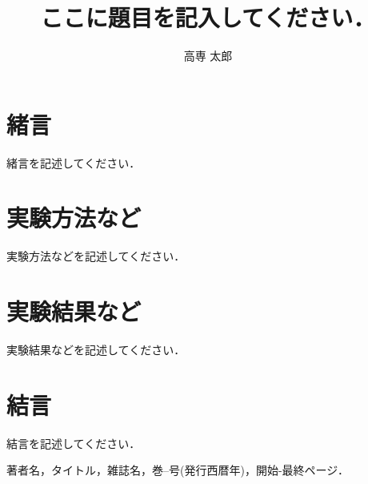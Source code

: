 \documentclass{advanced}
\title{ここに題目を記入してください．}
\author{高専 太郎}
\begin{document}
	\maketitle

	\section{緒言}

		緒言を記述してください．

	\section{実験方法など}

		実験方法などを記述してください．

	\section{実験結果など}

		実験結果などを記述してください．

	\section{結言}

		結言を記述してください．

\begin{thebibliography}{99}
	著者名，タイトル，雑誌名，巻--号(発行西暦年)，開始-最終ページ．
\end{thebibliography}
\end{document}
